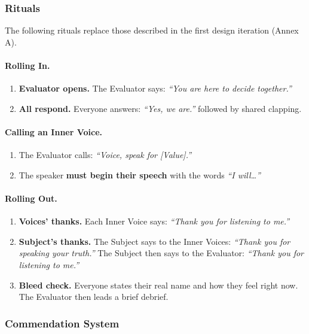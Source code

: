 \documentclass[12pt]{article}
\begin{document}
\subsubsection{Rituals}

The following rituals replace those described in the first design iteration (Annex A).

\paragraph{Rolling In.}
\begin{enumerate}
    \item \textbf{Evaluator opens.} The Evaluator says: \textit{``You are here to decide together.''}
    \item \textbf{All respond.} Everyone answers: \textit{``Yes, we are.''} followed by shared clapping.
\end{enumerate}

\paragraph{Calling an Inner Voice.}
\begin{enumerate}
    \item The Evaluator calls: \textit{``Voice, speak for [Value].''}
    \item The speaker \textbf{must begin their speech} with the words \textit{``I will\ldots''}
\end{enumerate}

\paragraph{Rolling Out.}
\begin{enumerate}
    \item \textbf{Voices' thanks.} Each Inner Voice says: \textit{``Thank you for listening to me.''}
    \item \textbf{Subject's thanks.} The Subject says to the Inner Voices: \textit{``Thank you for speaking your truth.''} The Subject then says to the Evaluator: \textit{``Thank you for listening to me.''}
    \item \textbf{Bleed check.} Everyone states their real name and how they feel right now. The Evaluator then leads a brief debrief.
\end{enumerate}

\subsubsection{Commendation System}
\end{document}
